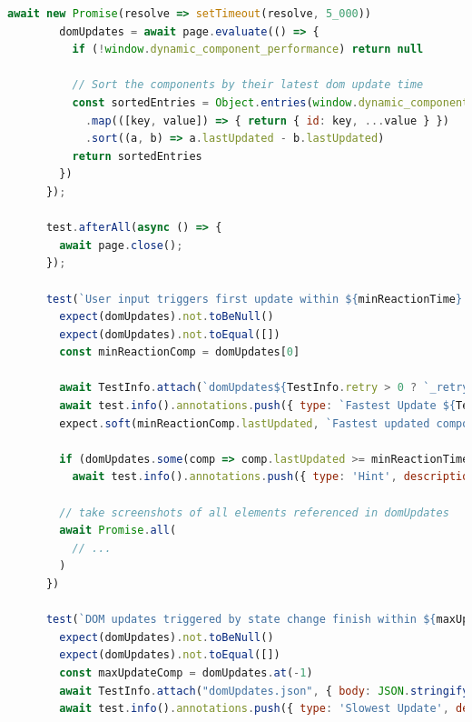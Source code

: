\documentclass[a4paper, 12pt]{article}
\begin{document}
\begin{lstlisting}[caption={Test file for component update times}, label={lst:state-change-spec}, language=JavaScript, escapechar=°]
        await new Promise(resolve => setTimeout(resolve, 5_000))
        domUpdates = await page.evaluate(() => {
          if (!window.dynamic_component_performance) return null

          // Sort the components by their latest dom update time
          const sortedEntries = Object.entries(window.dynamic_component_performance)
            .map(([key, value]) => { return { id: key, ...value } })
            .sort((a, b) => a.lastUpdated - b.lastUpdated)
          return sortedEntries
        })
      });

      test.afterAll(async () => {
        await page.close();
      });

      test(`User input triggers first update within ${minReactionTime} ms`, { tag: ['@minimalReactionTime'] }, async ({ }, TestInfo) => {
        expect(domUpdates).not.toBeNull()
        expect(domUpdates).not.toEqual([])
        const minReactionComp = domUpdates[0]

        await TestInfo.attach(`domUpdates${TestInfo.retry > 0 ? `_retry_${TestInfo.retry}` : ''}.json`, { body: JSON.stringify(domUpdates, null, 2), contentType: "application/json" })
        await test.info().annotations.push({ type: `Fastest Update ${TestInfo.retry > 0 ? `(retry #${TestInfo.retry})` : ''}`, description: `Component with id ${minReactionComp.id} loaded ${minReactionComp.lastUpdated}ms after user input (xPath: ${minReactionComp.xpath})` });
        expect.soft(minReactionComp.lastUpdated, `Fastest updated component with identifier ${minReactionComp.id} should update within ${minReactionTime} ms`).toBeLessThanOrEqual(minReactionTime)

        if (domUpdates.some(comp => comp.lastUpdated >= minReactionTime))
          await test.info().annotations.push({ type: 'Hint', description: `Screenshots below show slow updating components` });

        // take screenshots of all elements referenced in domUpdates
        await Promise.all(
          // ...
        )
      })

      test(`DOM updates triggered by state change finish within ${maxUpdateTime} ms`, { tag: ['@maximalReactionTime'] }, async ({ }, TestInfo) => {
        expect(domUpdates).not.toBeNull()
        expect(domUpdates).not.toEqual([])
        const maxUpdateComp = domUpdates.at(-1)
        await TestInfo.attach("domUpdates.json", { body: JSON.stringify(domUpdates, null, 2), contentType: "application/json" })
        await test.info().annotations.push({ type: 'Slowest Update', description: `Component with id ${maxUpdateComp.id} loaded ${maxUpdateComp.lastUpdated}ms after user input (xPath: ${maxUpdateComp.xpath})` });


\end{lstlisting}
\end{document}
